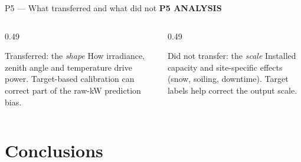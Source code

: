 \documentclass[aspectratio=169,11pt]{beamer}
\newcommand{\sectiontag}[1]{{\footnotesize\usebeamercolor[fg]{structure}\textbf{#1}}\par\vspace{0.10cm}}
\begin{document}
\begin{frame}{P5 — What transferred and what did not}
\sectiontag{P5 \quad ANALYSIS}
\begin{columns}[T,totalwidth=\textwidth]
\begin{column}{0.49\textwidth}
\begin{block}{Transferred: the \emph{shape}}
\small How irradiance, zenith angle and temperature drive power. Target-based calibration can correct part of the raw-kW prediction bias.
\end{block}
\end{column}
\begin{column}{0.49\textwidth}
\begin{block}{Did not transfer: the \emph{scale}}
\small Installed capacity and site-specific effects (snow, soiling, downtime). Target labels help correct the output scale.
\end{block}
\end{column}
\end{columns}
\vspace{0.2cm}

\end{frame}



\section{Conclusions}
\end{document}
